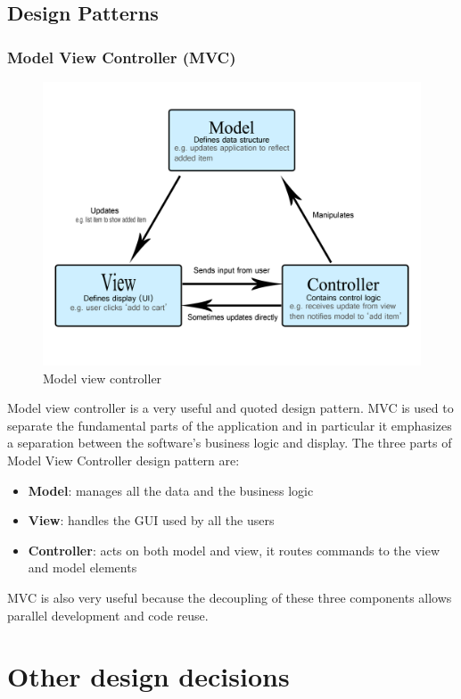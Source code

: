         \subsection{Design Patterns}
            \subsubsection*{Model View Controller (MVC)}
            \begin{figure}[H]
                \includegraphics[scale=0.9]{dd/resources/images/MVC.png}
                \caption{Model view controller}        
            \end{figure}
            Model view controller is a very useful and quoted design pattern.
            MVC is used to separate the fundamental parts of the application and
            in particular it  emphasizes a separation between the software’s
            business logic and display.
            The three parts of Model View Controller design pattern are:
            \begin{itemize}
                \item \textbf{Model}: manages all the data and the business logic
                \item \textbf{View}: handles the GUI used by all the users
                \item \textbf{Controller}: acts on both model and view, it
                routes commands to the view and model elements  
            \end{itemize}    
            MVC is also very useful because the decoupling of these three
            components allows parallel development and code reuse.
    \section{Other design decisions}